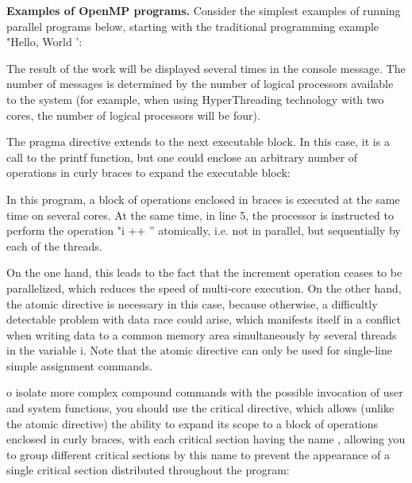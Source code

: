 {	\par\textbf{Examples of OpenMP programs.} Consider the simplest examples of running parallel programs below, starting with the traditional programming example "Hello, World ':
	\begin{figure}[H]
		
	\end{figure}
	\par The result of the work will be displayed several times in the console message. The number of messages is determined by the number of logical processors available to the system (for example, when using HyperThreading technology with two cores, the number of logical processors will be four). 
	\par The pragma directive extends to the next executable block. In this case, it is a call to the printf function, but one could enclose an arbitrary number of operations in curly braces to expand the executable block:
	\begin{figure}[H]
		
	\end{figure}
	In this program, a block of operations enclosed in braces is executed at the same time on several cores. At the same time, in line 5, the processor is instructed to perform the operation "i ++ '' atomically, i.e. not in parallel, but sequentially by each of the threads.
	\par On the one hand, this leads to the fact that the increment operation ceases to be parallelized, which reduces the speed of multi-core execution. On the other hand, the atomic directive is necessary in this case, because otherwise, a difficultly detectable problem with data race could arise, which manifests itself in a conflict when writing data to a common memory area simultaneously by several threads in the variable i. Note that the atomic directive can only be used for single-line simple assignment commands.
	\par o isolate more complex compound commands with the possible invocation of user and system functions, you should use the critical directive, which allows (unlike the atomic directive) the ability to expand its scope to a block of operations enclosed in curly braces, with each critical section having the name , allowing you to group different critical sections by this name to prevent the appearance of a single critical section distributed throughout the program:
	\begin{figure}[H]
		
	\end{figure}
}
